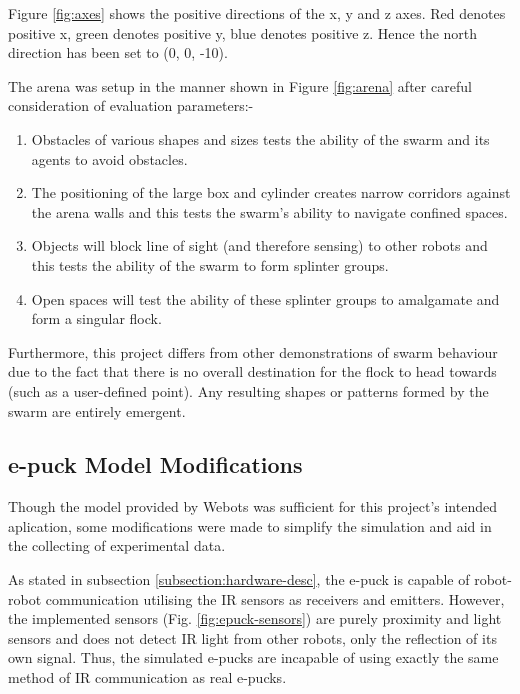 Figure \ref{fig:axes} shows the positive directions of the x, y and z axes. Red denotes positive x, green denotes positive y, blue denotes positive z. Hence the north direction has been set to (0, 0, -10). \newline

The arena was setup in the manner shown in Figure \ref{fig:arena} after careful consideration of evaluation parameters:-

\begin{enumerate}
	\item Obstacles of various shapes and sizes tests the ability of the swarm and its agents to avoid obstacles.
	\item The positioning of the large box and cylinder creates narrow corridors against the arena walls and this tests the swarm's ability to navigate confined spaces.
	\item Objects will block line of sight (and therefore sensing) to other robots and this tests the ability of the swarm to form splinter groups.
	\item Open spaces will test the ability of these splinter groups to amalgamate and form a singular flock.
\end{enumerate}

Furthermore, this project differs from other demonstrations of swarm behaviour due to the fact that there is no overall destination for the flock to head towards (such as a user-defined point). Any resulting shapes or patterns formed by the swarm are entirely emergent.

\subsection{e-puck Model Modifications}
\label{subsection:mod-desc}

Though the model provided by Webots was sufficient for this project's intended aplication, some modifications were made to simplify the simulation and aid in the collecting of experimental data.

As stated in subsection \ref{subsection:hardware-desc}, the e-puck is capable of robot-robot communication utilising the IR sensors as receivers and emitters. However, the implemented sensors (Fig. \ref{fig:epuck-sensors}) are purely proximity and light sensors and does not detect IR light from other robots, only the reflection of its own signal. Thus, the simulated e-pucks are incapable of using exactly the same method of IR communication as real e-pucks.

